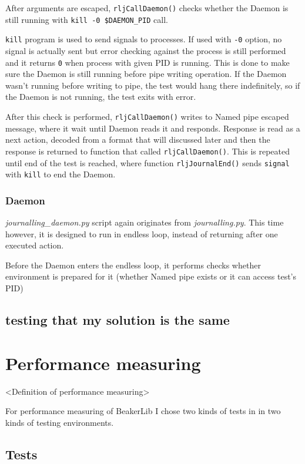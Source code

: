 After arguments are escaped, \texttt{rljCallDaemon()} checks whether the Daemon is still running with \texttt{kill -0 \$DAEMON\_PID} call. 

\texttt{kill} program is used to send signals to processes. If used with \texttt{-0} option, no signal is actually sent but error checking against the process is still performed and it returns \texttt{0} when process with given PID is running\cite{man_kill}. This is done to make sure the Daemon is still running before pipe writing operation.  If the Daemon wasn't running before writing to pipe, the test would hang there indefinitely, so if the Daemon is not running, the test exits with error.

After this check is performed, \texttt{rljCallDaemon()} writes to Named pipe escaped message, where it wait until Daemon reads it and responds. Response is read as a next action, decoded from a format that will discussed later and then the response is returned to function that called \texttt{rljCallDaemon()}. 
This is repeated until end of the test is reached, where function \texttt{rljJournalEnd()} sends \texttt{signal} with \texttt{kill} to end the Daemon. 

\subsection{Daemon}
\textit{journalling\_daemon.py} script again originates from \textit{journalling.py}. This time however, it is designed to run in endless loop, instead of returning after one executed action.

Before the Daemon enters the endless loop, it performs checks whether environment is prepared for it (whether Named pipe exists or it can access test's PID)  

\section{testing that my solution is the same}

\chapter{Performance measuring}
\label{performance}
<Definition of performance measuring>

For performance measuring of BeakerLib I chose two kinds of tests in in two kinds of testing environments.

\section{Tests}

